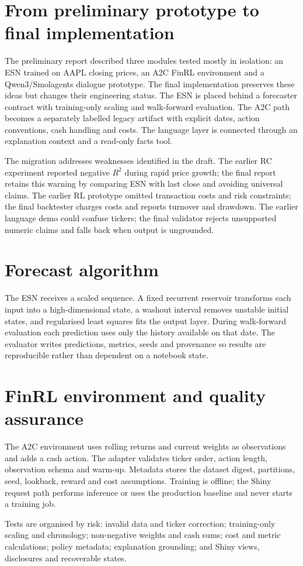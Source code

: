\section{From preliminary prototype to final implementation}
The preliminary report described three modules tested mostly in isolation: an ESN trained on AAPL closing prices, an A2C FinRL environment and a Qwen3/Smolagents dialogue prototype. The final implementation preserves these ideas but changes their engineering status. The ESN is placed behind a forecaster contract with training-only scaling and walk-forward evaluation. The A2C path becomes a separately labelled legacy artifact with explicit dates, action conventions, cash handling and costs. The language layer is connected through an explanation context and a read-only facts tool.

The migration addresses weaknesses identified in the draft. The earlier RC experiment reported negative $R^2$ during rapid price growth; the final report retains this warning by comparing ESN with last close and avoiding universal claims. The earlier RL prototype omitted transaction costs and risk constraints; the final backtester charges costs and reports turnover and drawdown. The earlier language demo could confuse tickers; the final validator rejects unsupported numeric claims and falls back when output is ungrounded.

\section{Forecast algorithm}
The ESN receives a scaled sequence. A fixed recurrent reservoir transforms each input into a high-dimensional state, a washout interval removes unstable initial states, and regularised least squares fits the output layer. During walk-forward evaluation each prediction uses only the history available on that date. The evaluator writes predictions, metrics, seeds and provenance so results are reproducible rather than dependent on a notebook state.

\section{FinRL environment and quality assurance}
The A2C environment uses rolling returns and current weights as observations and adds a cash action. The adapter validates ticker order, action length, observation schema and warm-up. Metadata stores the dataset digest, partitions, seed, lookback, reward and cost assumptions. Training is offline; the Shiny request path performs inference or uses the production baseline and never starts a training job.

Tests are organised by risk: invalid data and ticker correction; training-only scaling and chronology; non-negative weights and cash sums; cost and metric calculations; policy metadata; explanation grounding; and Shiny views, disclosures and recoverable states.
